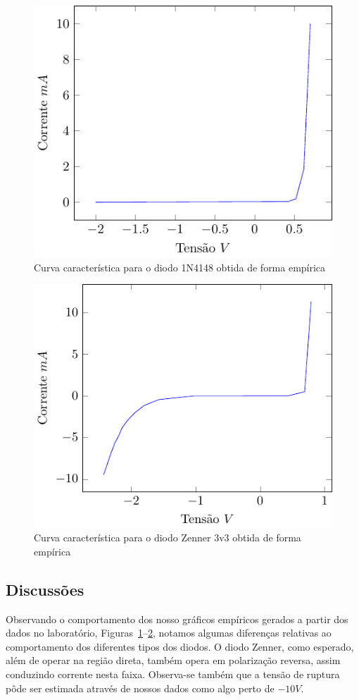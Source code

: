 \documentclass[12pt,a4paper]{article}
\begin{document}
\begin{figure}[htpb]
  \centering
  \includegraphics[width=0.8\linewidth]{1n4148_characteristics.pdf}
  \caption{Curva característica para o diodo 1N4148 obtida de forma empírica}
  \label{fig:2}
\end{figure}
\begin{figure}[htpb]
  \centering
  \includegraphics[width=0.8\linewidth]{zenner_characteristics.pdf}
  \caption{Curva característica para o diodo Zenner 3v3 obtida de forma empírica}
  \label{fig:3}
\end{figure}
\newpage
\subsection{Discussões}
Observando o comportamento dos nosso gráficos empíricos gerados a partir dos dados no laboratório, Figuras~\ref{fig:2}--\ref{fig:3}, notamos algumas diferenças relativas ao comportamento dos diferentes tipos dos diodos. O diodo Zenner, como esperado, além de operar na região direta, também opera em polarização reversa, assim conduzindo corrente nesta faixa. Observa-se também que a tensão de ruptura pôde ser estimada através de nossos dados como algo perto de $-10V$.
\end{document}
